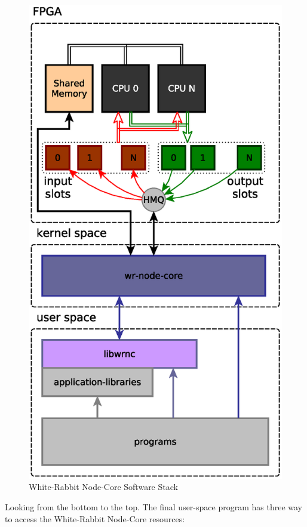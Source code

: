 \documentclass[a4paper,10pt]{article}
\begin{document}
\begin{figure}[ht]
	\centering
	\includegraphics[scale=0.5]{img/sw-gen-stack.eps}
	\caption{White-Rabbit Node-Core Software Stack}
        \label{fig:swgenstack}
\end{figure}

Looking from the bottom to the top. The final user-space program has
three way to access the White-Rabbit Node-Core resources:
\end{document}
